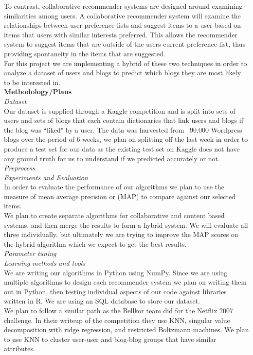 \documentclass[12pt]{article} %
\begin{document}
To contrast, collaborative recommender systems are designed around examining similarities among users. A collaborative recommender system will examine the relationships between user preference lists and suggest items to a user based on items that users with similar interests preferred. This allows the recommender system to suggest items that are outside of the users current preference list, thus providing spontaneity in the items that are suggested.\\
For this project we are implementing a hybrid of these two techniques in order to analyze a dataset of users and blogs to predict which blogs they are most likely to be interested in. \\

\noindent \textbf{Methodology/Plans} \\
\noindent 
\textit{Dataset}\\
Our dataset is supplied through a Kaggle competition and is split into sets of users and sets of blogs that each contain dictionaries that link users and blogs if the blog was ``liked" by a user. The data was harvested from ~90,000 Wordpress blogs over the period of 6 weeks, we plan on splitting off the last week in order to produce a test set for our data as the existing test set on Kaggle does not have any ground truth for us to understand if we predicted accurately or not.\\

\textit{Preprocess}\\

\textit{Experiments and Evaluation}\\
In order to evaluate the performance of our algorithms we plan to use the measure of mean average precision or (MAP) to compare against our selected items.\\%
We plan to create separate algorithms for collaborative and content based systems, and then merge the results to form a hybrid system. We will evaluate all three individually, but ultimately we are trying to improve the MAP scores on the hybrid algorithm which we expect to get the best results.\\ 

\textit{Parameter tuning}\\

\textit{Learning methods and tools}\\
We are writing our algorithms in Python using NumPy. Since we are using multiple algorithms to design each recommender system we plan on writing them out in Python, then testing individual aspects of our code against libraries written in R. We are using an SQL database to store our dataset.\\
We plan to follow a similar path as the Bellkor team did for the Netflix 2007 challenge. In their writeup of the competition  \cite{bell07} they use KNN, singular value decomposition with ridge regression, and restricted Boltzmann machines. We plan to use KNN to cluster user-user and blog-blog groups that have similar attributes. \\
\end{document}
